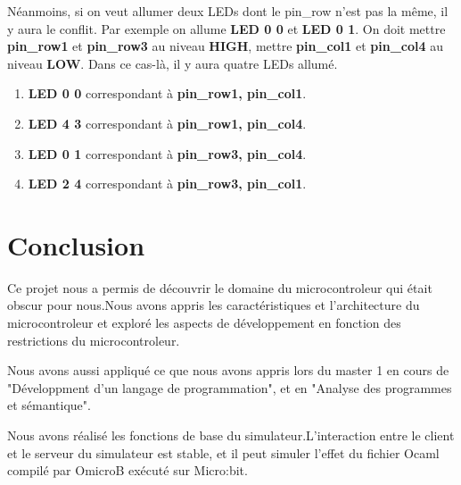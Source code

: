 \documentclass[14px]{article}
\begin{document}
Néanmoins, si on veut allumer deux LEDs dont le pin\_row n'est pas la même, il y aura le conflit. Par exemple on allume \textbf{LED 0 0} et \textbf{LED 0 1}. On doit mettre \textbf{pin\_row1} et \textbf{pin\_row3} au niveau \textbf{HIGH}, mettre \textbf{pin\_col1} et \textbf{pin\_col4} au niveau \textbf{LOW}. Dans ce cas-là, il y aura quatre LEDs allumé.
\begin{enumerate}
	\item \textbf{LED 0 0} correspondant à \textbf{pin\_row1, pin\_col1}.
	\item \textbf{LED 4 3} correspondant à \textbf{pin\_row1, pin\_col4}.
	\item \textbf{LED 0 1} correspondant à \textbf{pin\_row3, pin\_col4}.
	\item \textbf{LED 2 4} correspondant à \textbf{pin\_row3, pin\_col1}.
\end{enumerate}
\begin{figure}[htbp]
\end{figure}

\section{Conclusion}
Ce projet nous a permis de découvrir le domaine du microcontroleur qui était obscur pour nous.Nous avons appris les caractéristiques et l'architecture du microcontroleur et exploré les aspects de développement en fonction des restrictions du microcontroleur.

Nous avons aussi appliqué ce que nous avons appris lors du master 1 en cours de "Développment d'un langage de programmation", et en "Analyse des programmes et sémantique".

Nous avons réalisé les fonctions de base du simulateur.L'interaction entre le client et le serveur du simulateur est stable, et il peut simuler l'effet du fichier Ocaml compilé par OmicroB exécuté sur Micro:bit.
\end{document}
